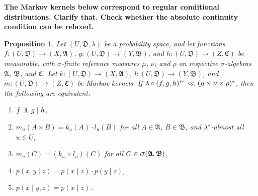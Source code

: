 \documentclass[
twoside=true,
paper=letter,
fontsize=9pt,
pagesize=auto,
leqno,
openany,
headsepline,
overfullrule,
]{scrbook}
\theoremstyle{plain}
\theoremstyle{plain}
\newtheorem{prop}[thm]{Proposition}
\theoremstyle{definition}
\theoremstyle{bfnoteitalic}
\theoremstyle{bfnoteroman}
\newcommand{\sigalg}[1]{\mathfrak{#1}}
\newcommand{\sagb}{\mathop{\hbox{\large{$\sigma$}}}\nolimits}
\newcommand{\textsigma}{\hbox{\large{$\sigma$}}\kern-1pt}
\newcommand{\preimage}[1]{#1^{\leftarrow}}
\newcommand{\sigmaalgebra}{\sigalg{A}}
\newcommand{\sigmaalgebraii}{\sigalg{B}}
\newcommand{\sigmaalgebraiii}{\sigalg{C}}
\newcommand{\productsig}[2]{\sagb(#1,#2)}
\newcommand{\kernast}{\ast\kern-1pt}
\newcommand{\funck}{k}
\newcommand{\funcl}{l}
\newcommand{\funcm}{m}
\newcommand{\function}{f}
\newcommand{\functionii}{g}
\newcommand{\functioniii}{h}
\newcommand{\measurespace}{X}
\newcommand{\measurespaceii}{Y}
\newcommand{\measurespaceiii}{Z}
\newcommand{\mspaceelt}{x}
\newcommand{\mspaceeltii}{y}
\newcommand{\mspaceeltiii}{z}
\newcommand{\abscont}{\mathrel{< \kern-3.5pt <}}
\newcommand{\measure}{\mu}
\newcommand{\measureii}{\nu}
\newcommand{\measureiii}{\lambda}
\newcommand{\measlambda}{\lambda}
\newcommand{\measureiv}{\rho}
\newcommand{\seti}{A}
\newcommand{\setii}{B}
\newcommand{\setiii}{C}
\newcommand{\uspace}{U}%
\newcommand{\uspaceelt}{u}
\newcommand{\uspacesig}{\sigalg{D}}
\newcommand{\condindep}[3]{#1\perp\kern-6pt\perp #2\mid #3}
\begin{document}
\textbf{The Markov kernels below correspond to regular conditional distributions.  Clarify that.  Check whether the absolute continuity condition can be relaxed.}
\begin{prop}\label{conditional_independence_equivalence}
Let
$(\uspace,\uspacesig,\measureiii)$
be a probability space, and let functions
$\function:(\uspace,\uspacesig)\to (\measurespace,\sigmaalgebra)$,
$\functionii:(\uspace,\uspacesig)\to (\measurespaceii,\sigmaalgebraii)$,
and
$\functioniii:(\uspace,\uspacesig)\to (\measurespaceiii,\sigmaalgebraiii)$
be measurable, with \textsigma-finite reference measures
$\measure$, $\measureii$, and $\measureiv$ on respective \textsigma-algebras
$\sigmaalgebra$, $\sigmaalgebraii$, and $\sigmaalgebraiii$.
Let
$\funck:(\uspace,\uspacesig)\to (\measurespace,\sigmaalgebra)$,
$\funcl:(\uspace,\uspacesig)\to (\measurespaceii,\sigmaalgebraii)$,
and
$\funcm:(\uspace,\uspacesig)\to (\measurespaceiii,\sigmaalgebraiii)$
be Markov kernels.
If
$\measureiii\circ\preimage{(\function,\functionii,\functioniii)}
\abscont
(\measure\times\measureii\times\measureiv)^*$,
then the following are equivalent:
\begin{enumerate}
\item
$\condindep{\function}{\functionii}{\functioniii}$, 
\item
$\funcm_\uspaceelt
(\seti\times\setii)
=
\funck_\uspaceelt(\seti)
\cdot
\funcl_\uspaceelt(\setii)$\quad
for all $\seti\in\sigmaalgebra$, $\setii\in\sigmaalgebraii$, and $\measlambda^\kernast$\hyp{}almost all
$\uspaceelt\in\uspace$,
\item
$\funcm_\uspaceelt(\setiii)
=
(\funck_\uspaceelt \times\funcl_\uspaceelt) (\setiii)$
\quad for all $\setiii\in\productsig{\sigmaalgebra}{\sigmaalgebraii}$,
\item
$p(\mspaceelt,\mspaceeltii\mid\mspaceeltiii)
= 
p(\mspaceelt\mid\mspaceeltiii)
\cdot
p(\mspaceeltii\mid\mspaceeltiii)$,
\item
$p(\mspaceelt\mid \mspaceeltii,\mspaceeltiii)
= 
p(\mspaceelt\mid\mspaceeltiii)$.
\end{enumerate}
\end{prop}
\end{document}
